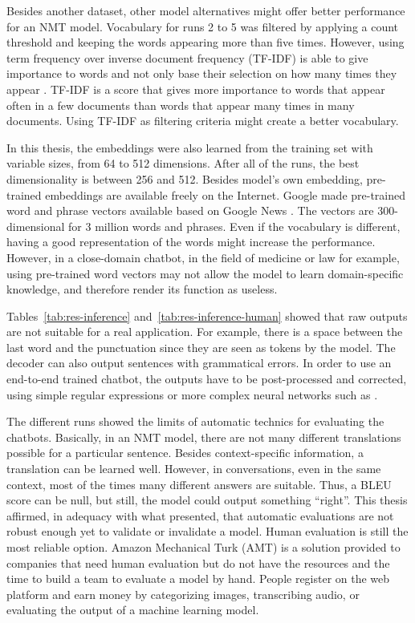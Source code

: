 Besides another dataset, other model alternatives might offer better performance for an NMT model. Vocabulary for runs 2 to 5 was filtered by applying a count threshold and keeping the words appearing more than five times.
However, using term frequency over inverse document frequency (TF-IDF) is able to give importance to words and not only base their selection on how many times they appear \citep{manning2008introduction}. TF-IDF is a score that gives more importance to words that appear often in a few documents than words that appear many times in many documents.
Using TF-IDF as filtering criteria might create a better vocabulary.

In this thesis, the embeddings were also learned from the training set with variable sizes, from 64 to 512 dimensions. After all of the runs, the best dimensionality is between 256 and 512.
Besides model's own embedding, pre-trained embeddings are available freely on the Internet. Google made pre-trained word and phrase vectors available based on Google News \citep{googlearchive-word2vec}. The vectors are 300-dimensional for 3 million words and phrases.
Even if the vocabulary is different, having a good representation of the words might increase the performance. However, in a close-domain chatbot, in the field of medicine or law for example, using pre-trained word vectors may not allow the model to learn domain-specific knowledge, and therefore render its function as useless.

Tables~\ref{tab:res-inference} and~\ref{tab:res-inference-human} showed that raw outputs are not suitable for a real application. For example, there is a space between the last word and the punctuation since they are seen as tokens by the model.
The decoder can also output sentences with grammatical errors. In order to use an end-to-end trained chatbot, the outputs have to be post-processed and corrected, using simple regular expressions or more complex neural networks such as \citet{1606.00189}.

The different runs showed the limits of automatic technics for evaluating the chatbots. Basically, in an NMT model, there are not many different translations possible for a particular sentence. Besides context-specific information, a translation can be learned well. However, in conversations, even in the same context, most of the times many different answers are suitable.
Thus, a BLEU score can be null, but still, the model could output something ``right''.
This thesis affirmed, in adequacy with what \citet{1603.08023} presented, that automatic evaluations are not robust enough yet to validate or invalidate a model. Human evaluation is still the most reliable option.
Amazon Mechanical Turk (AMT) is a solution provided to companies that need human evaluation but do not have the resources and the time to build a team to evaluate a model by hand. People register on the web platform and earn money by categorizing images, transcribing audio, or evaluating the output of a machine learning model.

